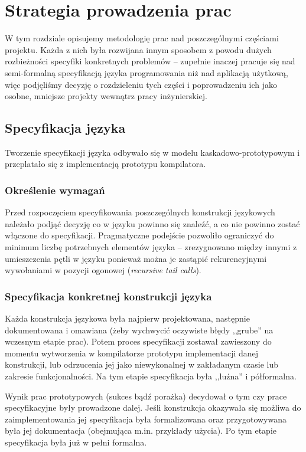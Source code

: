 \chapter{Strategia prowadzenia prac}
\label{strategia_prac}

W tym rozdziale opisujemy metodologię prac nad poszczególnymi częściami projektu. Każda z nich była rozwijana
innym sposobem z powodu dużych rozbieżności specyfiki konkretnych problemów -- zupełnie inaczej pracuje się
nad semi-formalną specyfikacją języka programowania niż nad aplikacją użytkową, więc podjęliśmy decyzję o
rozdzieleniu tych części i poprowadzeniu ich jako osobne, mniejsze projekty wewnątrz pracy inżynierskiej.

\section{Specyfikacja języka \ViuAct}

Tworzenie specyfikacji języka odbywało się w modelu kaskadowo-prototypowym i
przeplatało się z implementacją prototypu kompilatora.

\subsection{Określenie wymagań}

Przed rozpoczęciem specyfikowania poszczególnych konstrukcji językowych należało
podjąć decyzję co w języku powinno się znaleźć, a co nie powinno zostać włączone
do specyfikacji. Pragmatyczne podejście pozwoliło ograniczyć do minimum liczbę
potrzebnych elementów języka -- zrezygnowano między innymi z umieszczenia pętli
w języku ponieważ można je zastąpić rekurencyjnymi wywołaniami w pozycji
ogonowej (\emph{recursive tail calls}).

\subsection{Specyfikacja konkretnej konstrukcji języka}

Każda konstrukcja językowa była najpierw projektowana, następnie dokumentowana i
omawiana (żeby wychwycić oczywiste błędy ,,grube'' na wczesnym etapie prac).
Potem proces specyfikacji zostawał zawieszony do momentu wytworzenia w
kompilatorze prototypu implementacji danej konstrukcji, lub odrzucenia jej jako
niewykonalnej w zakładanym czasie lub zakresie funkcjonalności. Na tym etapie
specyfikacja była ,,luźna'' i półformalna.

Wynik prac prototypowych (sukces bądź porażka) decydował o tym czy prace
specyfikacyjne były prowadzone dalej. Jeśli konstrukcja okazywała się możliwa
do zaimplementowania jej specyfikacja była formalizowana oraz przygotowywana
była jej dokumentacja (obejmująca m.in. przykłady użycia). Po tym etapie
specyfikacja była już w pełni formalna.

